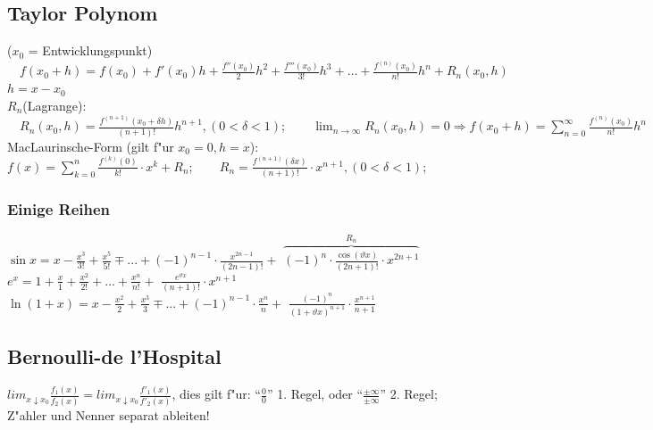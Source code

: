 \subsection{Taylor Polynom}
	($x_0$ = Entwicklungspunkt)$\quad f(x_0+h)=f(x_0) + f'(x_0)h + \frac{f''(x_0)}{2}h^2 + \frac{f'''(x_0)}{3!}h^3 + \ldots + \frac{f^{(n)}(x_0)}{n!}h^n + R_n(x_0, h)$\\
	$ h = x-x_0$\\
	$R_n$(Lagrange):$\quad R_n(x_0, h) = \frac{f^{(n+1)}(x_0 + \delta h)}{(n+1)!}h^{n+1}, (0 < \delta < 1);
	\qquad 
	\lim_{n \to \infty} R_n(x_0, h) = 0 \Longrightarrow f(x_0+h) = \sum\limits_{n=0}^{\infty} \frac{f^{(n)}(x_0)}{n!}h^n$\\	
	\flushleft MacLaurinsche-Form (gilt f"ur $x_0=0, h=x $): $ f(x)=\sum\limits_{k=0}^{n} \frac{f^{(k)}(0)}{k!} \cdot x^k + R_n; 
	\qquad 
	R_n = \frac{f^{(n+1)}(\delta x)}{(n+1)!} \cdot x^{n+1}, (0 < \delta < 1);$
	
\subsubsection{Einige Reihen}
		$\sin x = x - \frac{x^3}{3!} +  \frac{x^5}{5!} \mp ... + (-1)^{n-1} \cdot \frac{x^{2n-1}}{(2n-1)!} + $
		$ \overbrace{(-1)^n \cdot \frac{\cos(\vartheta x)}{(2n+1)!} \cdot x^{2n+1}}^{R_n} $\\
		$e^x =  1 + \frac{x}{1} + \frac{x^2}{2!} + ... + \frac{x^n}{n!} + $
		$ \frac{e^{\vartheta x}}{(n+1)!} \cdot x^{n+1} $\\
		$\ln (1+x) = x - \frac{x^2}{2} + \frac{x^3}{3} \mp ... + (-1)^{n-1} \cdot \frac{x^n}{n} + $
		$ \frac{(-1)^n}{(1+\vartheta x)^{n+1}} \cdot \frac{x^{n+1}}{n+1} $ 

\subsection{Bernoulli-de l'Hospital}
	${lim} _{x\downarrow x_{0}} \frac{f_{1}(x)}{f_{2}(x)} = {lim} _{x\downarrow x_{0}} \frac{f'_{1}(x)}{f'_{2}(x)} $, dies gilt f"ur: "`$\frac{0}{0}$"' 1. Regel, oder "`$\frac{\pm\infty}{\pm\infty}$"' 2. Regel;   Z"ahler und Nenner separat ableiten!

